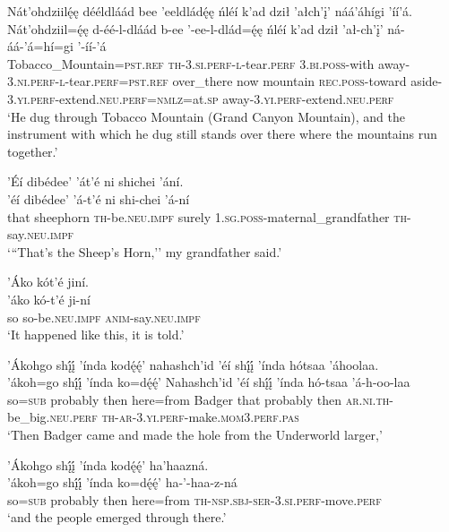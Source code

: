 \ea\label{ex:text4-5-2}
Nát’ohdziilę́ę dééldláád bee ’eeldládę́ę ńléí k’ad dził ’ałch’į’ náá’áhígi ’íí’á.\\
\gll Nát’ohdziil=ę́ę	d-éé-l-dláád	b-ee	’-ee-l-dlád=ę́ę	ńléí	k’ad	dził	’ał-ch’į’	ná-áá-’á=hí=gi	’-íí-’á\\
     Tobacco\_Mountain=\textsc{pst}.\textsc{ref}	\textsc{th}-3.\textsc{si}.\textsc{perf}-\textsc{l}-tear.\textsc{perf}	3.\textsc{bi}.\textsc{poss}-with	away-3.\textsc{ni}.\textsc{perf}-\textsc{l}-tear.\textsc{perf}=\textsc{pst}.\textsc{ref}	over\_there	now	mountain	\textsc{rec}.\textsc{poss}-toward	aside-3.\textsc{yi}.\textsc{perf}-extend.\textsc{neu}.\textsc{perf}=\textsc{nmlz}=at.\textsc{sp}	away-3.\textsc{yi}.\textsc{perf}-extend.\textsc{neu}.\textsc{perf}\\
\glt `He dug through Tobacco Mountain (Grand Canyon Mountain), and the instrument with which he dug still stands over there where the mountains run together.'
\z

\ea\label{ex:text4-5-3}
’Éí dibédee’ ’át’é ni shichei ’ání.\\
\gll ’éí	dibédee’	’á-t’é	ni	shi-chei	’á-ní\\
     that	sheephorn	\textsc{th}-be.\textsc{neu}.\textsc{impf}	surely	1.\textsc{sg}.\textsc{poss}-maternal\_grandfather	\textsc{th}-say.\textsc{neu}.\textsc{impf}\\
\glt `{``}That's the Sheep's Horn,'' my grandfather said.'
\z

\ea\label{ex:text4-5-4}
’Áko kót’é jiní.\\
\gll ’áko	kó-t’é	ji-ní\\
     so	so-be.\textsc{neu}.\textsc{impf}	\textsc{anim}-say.\textsc{neu}.\textsc{impf}\\
\glt `It happened like this, it is told.'
\z

\ea\label{ex:text4-5-5}
’Ákohgo shį́į́ ’índa kodę́ę́’ nahashch’id ’éí shį́į́ ’índa hótsaa ’áhoolaa.\\
\gll ’ákoh=go	shį́į́	’índa	ko=dę́ę́’	Nahashch’id	’éí	shį́į́	’índa	hó-tsaa	’á-h-oo-laa\\
     so=\textsc{sub}	probably	then	here=from	Badger	that	probably	then	\textsc{ar}.\textsc{ni}.\textsc{th}-be\_big.\textsc{neu}.\textsc{perf}	\textsc{th}-\textsc{ar}-3.\textsc{yi}.\textsc{perf}-make.\textsc{mom}3.\textsc{perf}.\textsc{pas}\\
\glt `Then Badger came and made the hole from the Underworld larger,'
\z

\ea\label{ex:text4-5-6}
’Ákohgo shį́į́ ’índa kodę́ę́’ ha’haazná.\\
\gll ’ákoh=go	shį́į́	’índa	ko=dę́ę́’	ha-’-haa-z-ná\\
     so=\textsc{sub}	probably	then	here=from	\textsc{th}-\textsc{nsp}.\textsc{sbj}-\textsc{ser}-3.\textsc{si}.\textsc{perf}-move.\textsc{perf}\\
\glt `and the people emerged through there.'
\z

